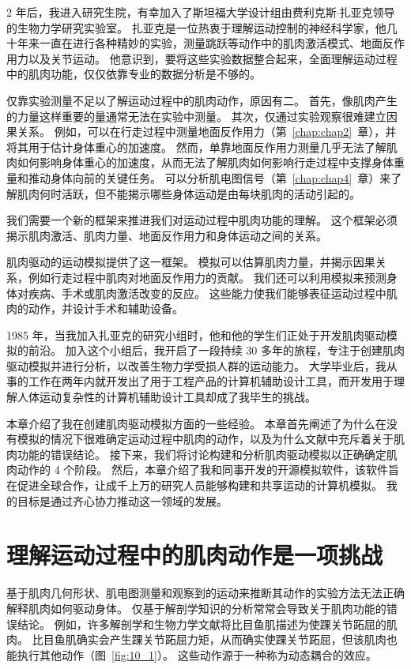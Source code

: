2 年后，我进入研究生院，有幸加入了斯坦福大学设计组由费利克斯$\cdot$扎亚克领导的生物力学研究实验室。
扎亚克是一位热衷于理解运动控制的神经科学家，他几十年来一直在进行各种精妙的实验，测量跳跃等动作中的肌肉激活模式、地面反作用力以及关节运动。
他意识到，要将这些实验数据整合起来，全面理解运动过程中的肌肉功能，仅仅依靠专业的数据分析是不够的。


仅靠实验测量不足以了解运动过程中的肌肉动作，原因有二。
首先，像肌肉产生的力量这样重要的量通常无法在实验中测量。
其次，仅通过实验观察很难建立因果关系。
例如，可以在行走过程中测量地面反作用力（第~\ref{chap:chap2}~章），并将其用于估计身体重心的加速度。
然而，单靠地面反作用力测量几乎无法了解肌肉如何影响身体重心的加速度，从而无法了解肌肉如何影响行走过程中支撑身体重量和推动身体向前的关键任务。
可以分析肌电图信号（第~\ref{chap:chap4}~章）来了解肌肉何时活跃，但不能揭示哪些身体运动是由每块肌肉的活动引起的。


我们需要一个新的框架来推进我们对运动过程中肌肉功能的理解。
这个框架必须揭示肌肉激活、肌肉力量、地面反作用力和身体运动之间的关系。


肌肉驱动的运动模拟提供了这一框架。
模拟可以估算肌肉力量，并揭示因果关系，例如行走过程中肌肉对地面反作用力的贡献。
我们还可以利用模拟来预测身体对疾病、手术或肌肉激活改变的反应。
这些能力使我们能够表征运动过程中肌肉的动作，并设计手术和辅助设备。


1985 年，当我加入扎亚克的研究小组时，他和他的学生们正处于开发肌肉驱动模拟的前沿。
加入这个小组后，我开启了一段持续 30 多年的旅程，专注于创建肌肉驱动模拟并进行分析，以改善生物力学受损人群的运动能力。
大学毕业后，我从事的工作在两年内就开发出了用于工程产品的计算机辅助设计工具，而开发用于理解人体运动复杂性的计算机辅助设计工具却成了我毕生的挑战。


本章介绍了我在创建肌肉驱动模拟方面的一些经验。
本章首先阐述了为什么在没有模拟的情况下很难确定运动过程中肌肉的动作，以及为什么文献中充斥着关于肌肉功能的错误结论。
接下来，我们将讨论构建和分析肌肉驱动模拟以正确确定肌肉动作的 4 个阶段。
然后，本章介绍了我和同事开发的开源模拟软件，该软件旨在促进全球合作，让成千上万的研究人员能够构建和共享运动的计算机模拟。
我的目标是通过齐心协力推动这一领域的发展。


\section{理解运动过程中的肌肉动作是一项挑战}

基于肌肉几何形状、肌电图测量和观察到的运动来推断其动作的实验方法无法正确解释肌肉如何驱动身体。
仅基于解剖学知识的分析常常会导致关于肌肉功能的错误结论。
例如，许多解剖学和生物力学文献将比目鱼肌描述为使踝关节跖屈的肌肉。
比目鱼肌确实会产生踝关节跖屈力矩，从而确实使踝关节跖屈，但该肌肉也能执行其他动作（图~\ref{fig:10_1}）。
这些动作源于一种称为动态耦合的效应。

